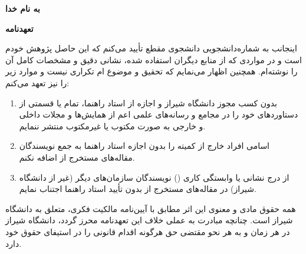 \centerline{\textbf{به نام خدا}}

\vspace{\baselineskip}
\centerline{\textbf{تعهدنامه}}

\vspace{\baselineskip}
\noindent
اینجانب {\persianname} به شماره‌دانشجویی {\persianstudentnumber} دانشجوی مقطع {\persiandegree} تأیید می‌کنم که این {\persiantype} حاصل پژوهش خودم است و در مواردی که از منابع دیگران استفاده شده، نشانی دقیق و مشخصات کامل آن را نوشته‌ام. همچنین اظهار می‌نمایم که تحقیق و موضوع {\persiantype}‌ام تکراری نیست و موارد زیر را نیز تعهد می‌کنم:

\begin{enumerate}
    \item بدون کسب مجوز دانشگاه شیراز و اجازه از استاد راهنما، تمام یا قسمتی از دستاوردهای {\persiantype} خود را در مجامع و رسانه‌های علمی اعم از همایش‌ها و مجلات داخلی و خارجی به صورت مکتوب یا غیرمکتوب منتشر ننمایم.
    \item اسامی افراد خارج از کمیته {\persiantype} را بدون اجازه استاد راهنما به جمع نویسندگان مقاله‌های مستخرج از {\persiantype} اضافه نکنم.
    \item از درج نشانی یا وابستگی کاری () نویسندگان سازمان‌های دیگر (غیر از دانشگاه شیراز) در مقاله‌های مستخرج از {\persiantype} بدون تأیید استاد راهنما اجتناب نمایم.
\end{enumerate}

همه حقوق مادی و معنوی این اثر مطابق با آیین‌نامه مالکیت فکری، متعلق به دانشگاه شیراز است. چنانچه مبادرت به عملی خلاف این تعهدنامه محرز گردد، دانشگاه شیراز در هر زمان و به هر نحو مقتضی حق هرگونه اقدام قانونی را در استیفای حقوق خود دارد.

\vspace{2\baselineskip}
\centerline{{\persianname}}
\centerline{{\persiandefensedate}}
